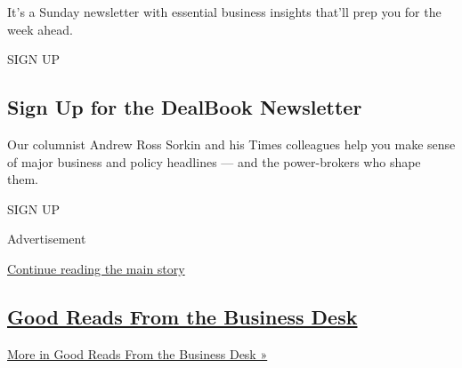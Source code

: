 It's a Sunday newsletter with essential business insights that'll prep
you for the week ahead.

SIGN UP

\hypertarget{sign-up-for-the-dealbook-newsletter}{%
\subsection{Sign Up for the DealBook
Newsletter}\label{sign-up-for-the-dealbook-newsletter}}

Our columnist Andrew Ross Sorkin and his Times colleagues help you make
sense of major business and policy headlines --- and the power-brokers
who shape them.

SIGN UP

Advertisement

\protect\hyperlink{after-mid1}{Continue reading the main story}

\hypertarget{good-reads-from-the-business-desk}{%
\subsection{\texorpdfstring{\href{/spotlight/editors-picks-business}{Good
Reads From the Business
Desk}}{Good Reads From the Business Desk}}\label{good-reads-from-the-business-desk}}

\href{/spotlight/editors-picks-business}{More in Good Reads From the
Business Desk »}

